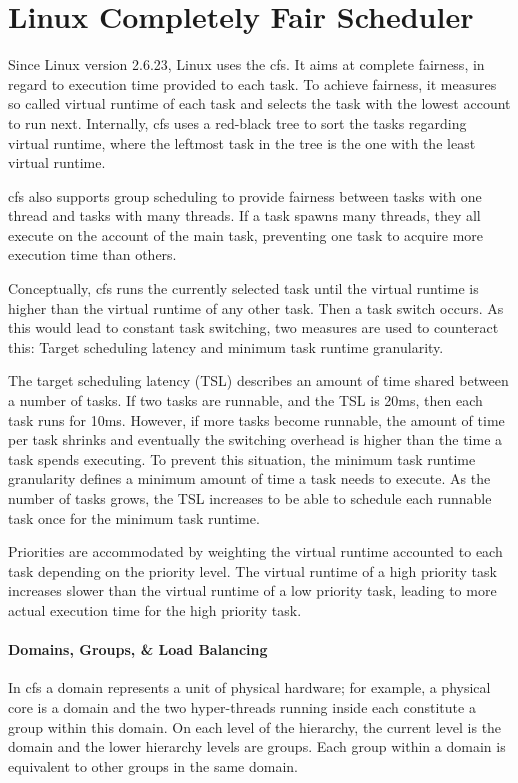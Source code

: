 \section{Linux Completely Fair Scheduler}
\label{state:cfs}


Since Linux version 2.6.23, Linux uses the \gls{cfs}.
It aims at complete fairness, in regard to execution time provided to each task.
To achieve fairness, it measures so called virtual runtime of each task and
selects the task with the lowest account to run next.
Internally, \gls{cfs} uses a red-black tree to sort the tasks regarding virtual
runtime, where the leftmost task in the tree is the one with the least virtual
runtime.

\gls{cfs} also supports group scheduling to provide fairness between tasks with one
thread and tasks with many threads.
If a task spawns many threads, they all execute on the account of the main
task, preventing one task to acquire more execution time than others.

Conceptually, \gls{cfs} runs the currently selected task until the virtual runtime is
higher than the virtual runtime of any other task.
Then a task switch occurs.
As this would lead to constant task switching, two measures are used to
counteract this: Target scheduling latency and minimum task runtime granularity.

The target scheduling latency (TSL) describes an amount of time shared between a
number of tasks.
If two tasks are runnable, and the TSL is 20ms, then each task runs for 10ms.
However, if more tasks become runnable, the amount of time per task shrinks and
eventually the switching overhead is higher than the time a task spends
executing.
To prevent this situation, the minimum task runtime granularity defines a
minimum amount of time a task needs to execute.
As the number of tasks grows, the TSL increases to be able to schedule each
runnable task once for the minimum task runtime.

Priorities are accommodated by weighting the virtual runtime accounted to each
task depending on the priority level.
The virtual runtime of a high priority task increases slower than the virtual
runtime of a low priority task, leading to more actual execution time for the
high priority task.

\paragraph{Domains, Groups, \& Load Balancing}
In \gls{cfs} a domain represents a unit of physical hardware;
for example, a physical core is a domain and the two hyper-threads running
inside each constitute a group within this domain.
On each level of the hierarchy, the current level is the domain and the lower
hierarchy levels are groups.
Each group within a domain is equivalent to other groups in the same domain.

